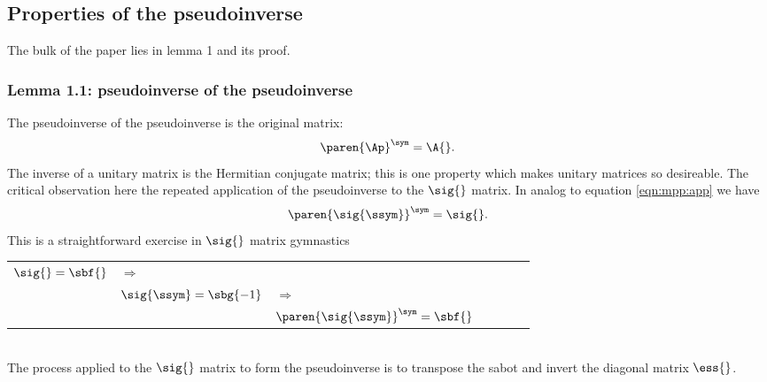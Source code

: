 \subsection{Properties of the pseudoinverse}
The bulk of the paper lies in lemma 1 and its proof.

\subsubsection{Lemma 1.1: pseudoinverse of the pseudoinverse}
The pseudoinverse of the pseudoinverse is the original matrix:
\begin{equation}
  \paren{\Ap}^{\sym} = \A{}.
  \label{eqn:mpp:app}
\end{equation}
The inverse of a unitary matrix is the Hermitian conjugate matrix; this is one property which makes unitary matrices so desireable. The critical observation here the repeated application of the pseudoinverse to the $\sig{}$ matrix. In analog to equation \eqref{eqn:mpp:app} we have
\begin{equation}
  \paren{\sig{\ssym}}^{\sym} = \sig{}.
  \label{eqn:mpp:spp}
\end{equation}
This is a straightforward exercise in $\sig{}$ matrix gymnastics
\begin{table}[htdp]
\begin{center}
\begin{tabular}{lllllll}
%
    $\sig{} = \sbf{}$ & $\Rightarrow$ \\
%
  & $\sig{\ssym} = \sbg{-1}$ & $\Rightarrow$ \\
%
 && $\paren{\sig{\ssym}}^{\sym}  = \sbf{}$
\end{tabular}
\end{center}
\label{tab:sigma gymnastics}
\end{table}\\
The process applied to the $\sig{}$ matrix to form the pseudoinverse is to transpose the sabot and invert the diagonal matrix $\ess{}$.


